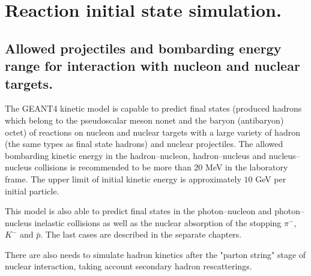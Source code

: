 \section{Reaction initial state simulation.}

\subsection{Allowed projectiles and bombarding energy range for interaction 
with nucleon and nuclear targets.}
\hspace{1.0em}
The GEANT4 kinetic model is capable to predict final states (produced 
hadrons 
which belong to the pseudoscalar meson nonet and the baryon (antibaryon) 
octet) of reactions on nucleon and nuclear targets 
with a large variety of hadron (the same types as final state hadrons) and 
nuclear projectiles. The allowed bombarding kinetic energy in 
the hadron--nucleon, 
  hadron--nucleus and nucleus--nucleus collisions 
 is recommended to be more than 
 20 MeV in the laboratory frame.
  The upper limit of initial 
  kinetic energy is approximately $10$ GeV per initial particle. 
   
  This model is also able to predict
final states in the photon--nucleon and photon--nucleus inelastic 
collisions  as well as the nuclear absorption of the 
stopping $\pi^{-}$, $K^{-}$ and $\bar{p}$. 
 The last cases are described in the 
separate chapters.

  There are also needs
 to simulate hadron
kinetics after the "parton string" stage of nuclear interaction, taking
account secondary hadron rescatterings.

